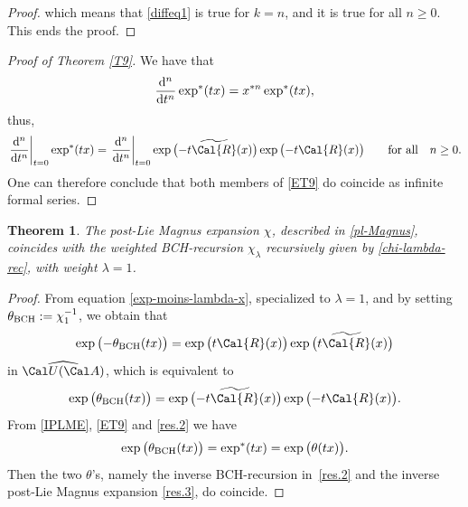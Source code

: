 \documentclass[pdftex]{sigma}
\numberwithin{equation}{section}
\newtheorem{Theorem}{Theorem}[section]
\begin{document}
\begin{proof}
{}

\noindent which means that \eqref{diffeq1} is true for $k=n$, and it is true for all $n \geq 0$. This ends the proof.
\end{proof}

\begin{proof}[Proof of Theorem \ref{T9}]
We have that
\begin{equation*}
\frac{{\rm d}^n}{{\rm d}t^n} \exp^{\ast}(tx) = x^{\ast n} \exp^{\ast}(tx),
\end{equation*}
thus,
\begin{equation*}
\left.\frac{{\rm d}^n}{{\rm d}t^n}\right\vert_{t=0} \exp^{\ast}(tx) = \left.\frac{{\rm d}^n}{{\rm d}t^n}\right\vert_{t=0} \exp\big({-}t \widetilde{\Cal{R}}(x)\big) \exp\big({-}t \Cal{R}(x)\big)\qquad \hbox{for all}\quad n\geq 0.
\end{equation*}
One can therefore conclude that both members of \eqref{ET9} do coincide as infinite formal series.
\end{proof}
\begin{Theorem}\label{main Theorem}
The post-Lie Magnus expansion $\chi$, described in \eqref{pl-Magnus}, coincides with the weighted BCH-recursion $\chi_{\lambda}$ recursively given by \eqref{chi-lambda-rec}, with weight $\lambda=1$.
\end{Theorem}

\begin{proof}
From equation \eqref{exp-moins-lambda-x}, specialized to $\lambda=1$, and by setting $\theta_{\rm BCH} :=\chi_{1}^{-1}$, we obtain that
\begin{displaymath}
\exp\big({-}\theta_{\rm BCH}(tx)\big)
= \exp\big(t \Cal{R}(x)\big) \exp\big(t \widetilde{\Cal{R}}(x)\big)
\end{displaymath}
in $\widehat{\Cal U(\Cal A)}$, which is equivalent to
\begin{equation}\label{res.2}
\exp\big(\theta_{\rm BCH}(tx)\big)
= \exp\big({-}t \widetilde{\Cal{R}}(x)\big) \exp\big({-}t \Cal{R}(x)\big).
\end{equation}
From \eqref{IPLME}, \eqref{ET9} and \eqref{res.2} we have
\begin{equation}\label{res.3}
\exp\big(\theta_{\rm BCH}(tx)\big) = \exp^{\ast}(tx)= \exp\big(\theta(tx)\big).
\end{equation}
Then the two $\theta$'s, namely the inverse BCH-recursion in~\eqref{res.2} and the inverse post-Lie Magnus expansion \eqref{res.3}, do coincide.
\end{proof}
\end{document}
